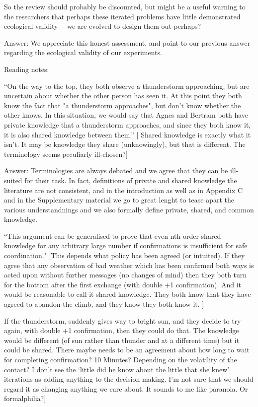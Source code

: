 \documentclass{article}
\newenvironment{robin}{\smallskip \noindent \color{red!10!green!50!blue}}{\color{black}\smallskip}
\begin{document}
So the review should probably be discounted, but might be a useful warning to the researchers that perhaps these iterated problems have little demonstrated ecological validity—-we are evolved to design them out perhaps?

\begin{robin} Answer: We appreciate this honest assessment, and point to our previous answer regarding the ecological validity of our experiments.
\end{robin}

Reading notes:

``On the way to the top, they both observe a thunderstorm approaching, but are uncertain about whether the other person has seen it. At this point they both know the fact that "a thunderstorm approaches", but don't know whether the other knows. In this situation, we would say that Agnes and Bertram both have private knowledge that a thunderstorm approaches, and since they both know it, it is also shared knowledge between them.''
[ Shared knowledge is exactly what it isn't. It may be knowledge they share (unknowingly), but that is different. The terminology seems peculiarly ill-chosen?]

\begin{robin} Answer: Terminologies are always debated and we agree that they can be ill-suited for their task. In fact, definitions of private and shared knowledge the literature are not consistent, and in the introduction as well as in Appendix C and in the Supplementary material we go to great lenght to tease apart the various understandnings and we also formally define private, shared, and common knowledge.
\end{robin}

``This argument can be generalised to prove that even nth-order shared knowledge for any arbitrary large number if confirmations is insufficient for safe coordination." [This depends what policy has been agreed (or intuited). If they agree that any observation of bad weather which has been confirmed both ways is acted upon without further messages (no changes of mind) then they both turn for the bottom after the first exchange (with double +1 confirmation). And it would be reasonable to call it shared knowledge. They both know that they have agreed to abandon the climb, and they know they both know it. ]

If the thunderstorm, suddenly gives way to bright sun, and they decide to try again, with double +1 confirmation, then they could do that. The knowledge would be different (of sun rather than thunder and at a different time) but it could be shared. There maybe needs to be an agreement about how long to wait for completing confirmation? 10 Minutes? Depending on the volatility of the contact? I don't see the `little did he know about the little that she knew' iterations as adding anything to the decision making. I'm not sure that we should regard it as changing anything we care about. It sounds to me like paranoia. Or formalphilia?]
\end{document}
